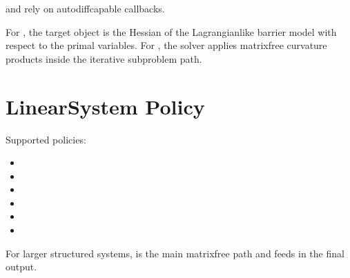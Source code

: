 \documentclass[letterpaper,10pt,english]{sphinxmanual}
\begin{document}
\sphinxAtStartPar
{} and  rely on autodiff\sphinxhyphen{}capable callbacks.

\sphinxAtStartPar
For , the target object is the Hessian of the Lagrangian\sphinxhyphen{}like barrier model with respect to the primal variables. For , the solver applies matrix\sphinxhyphen{}free curvature products inside the iterative subproblem path.


\section{Linear\sphinxhyphen{}System Policy}
\label{\detokenize{optima_internal_protocol:linear-system-policy}}
\sphinxAtStartPar
Supported policies:
\begin{itemize}
\item {} 
\sphinxAtStartPar
{}

\item {} 
\sphinxAtStartPar
{}

\item {} 
\sphinxAtStartPar
{}

\item {} 
\sphinxAtStartPar
{}

\item {} 
\sphinxAtStartPar
{}

\item {} 
\sphinxAtStartPar
{}

\end{itemize}

\sphinxAtStartPar
For larger structured systems,  is the main matrix\sphinxhyphen{}free path and feeds  in the final output.
\end{document}
